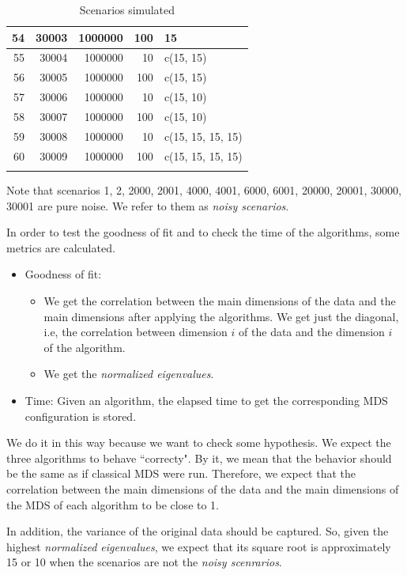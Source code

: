 \documentclass[11pt]{report}
\begin{document}
\begin{longtable}{|r|r|r|r|l|}
\hline
54 & 30003 & 1000000 & 100 & 15 \\ 
\hline
55 & 30004 & 1000000 & 10 & c(15, 15) \\ 
\hline
56 & 30005 & 1000000 & 100 & c(15, 15) \\ 
\hline
57 & 30006 & 1000000 & 10 & c(15, 10) \\ 
\hline
58 & 30007 & 1000000 & 100 & c(15, 10) \\ 
\hline
59 & 30008 & 1000000 & 10 & c(15, 15, 15, 15) \\ 
\hline
60 & 30009 & 1000000 & 100 & c(15, 15, 15, 15) \\ 
\hline
\caption{Scenarios simulated} 
\label{scenarios_sim}
\end{longtable}


\indent Note that scenarios 1, 2, 2000, 2001, 4000, 4001, 6000, 6001, 20000,
20001, 30000, 30001 are pure noise. We refer to them as \textit{noisy 
scenarios}.

\indent In order to test the goodness of fit and to check the time of the 
algorithms, some metrics are calculated.

\begin{itemize}
\item Goodness of fit:
\begin{itemize}


\item We get the correlation between the main dimensions of the data and the
main dimensions after applying the algorithms. We get just the diagonal, i.e,
the correlation between dimension $i$ of the data and the dimension $i$ of the
algorithm. 

\item We get the \textit{normalized eigenvalues}.
\end{itemize}

\item Time: Given an algorithm, the elapsed time to get the corresponding MDS
configuration is stored.

\end{itemize}

\indent We do it in this way because we want to check some hypothesis. We 
expect the three algorithms to behave ``correcty". By it, we mean that the
behavior should be the same as if classical MDS were run. Therefore, we 
expect that the correlation between the main dimensions of the data and the
main dimensions of the MDS of each algorithm to be close to 1.

\indent In addition, the variance of the original data should be captured. 
So, given the highest \textit{normalized eigenvalues}, we expect that 
its square root is approximately 15 or 10 when the scenarios are not the 
\textit{noisy scenrarios}. 
\end{document}
